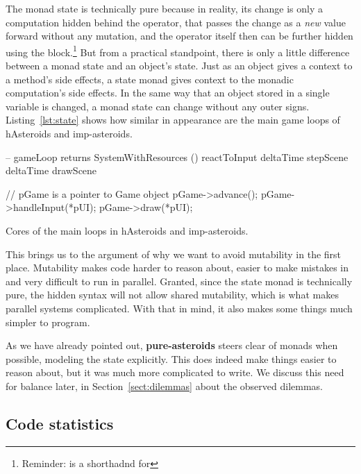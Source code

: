 \documentclass[
  digital, %
  color,   %
  table,   %
  oneside, %
  lof,     %
  lot,     %
]{fithesis3}
\begin{document}
{The monad state is technically pure because in reality,
its change is only a computation hidden behind the \inlinehs{>>=} operator,
that passes the change as a \emph{new} value forward without any mutation,
and the operator itself then can be further hidden using the  block.\footnote{
Reminder:  is a shorthadnd for
}
But from a practical standpoint, there is only a little difference between a monad state
and an object's state. Just as an object gives a context to a method's side effects,
a state monad gives context to the monadic computation's side effects.
In the same way that an object stored in a single variable is changed, a monad state
can change without any outer signs. Listing~\ref{lst:state} shows how similar in appearance
are the main game loops of hAsteroids and imp-asteroids.

\begin{listing}
\begin{haskell}
-- gameLoop returns SystemWithResources ()
reactToInput deltaTime
stepScene deltaTime
drawScene
\end{haskell}
\begin{cppblock}
// pGame is a pointer to Game object
pGame->advance();
pGame->handleInput(*pUI);
pGame->draw(*pUI);
\end{cppblock}
\caption{Cores of the main loops in hAsteroids and imp-asteroids.}
\label{lst:state}
\end{listing}

This brings us to the argument of why we want to avoid mutability in the first place.
Mutability makes code harder to reason about, easier to make mistakes in and
very difficult to run in parallel. Granted, since the state monad is technically
pure, the hidden syntax will not allow shared mutability,
which is what makes parallel systems complicated.
With that in mind, it also makes some things much simpler to program.

As we have already pointed out, \textbf{pure-asteroids} steers clear of monads when possible,
modeling the state explicitly. This does indeed make things easier to reason about,
but it was much more complicated to write.
We discuss this need for balance later, in Section~\ref{sect:dilemmas} about the observed dilemmas.



\subsection{Code statistics}
\label{sect:codestats}

}
\end{document}

